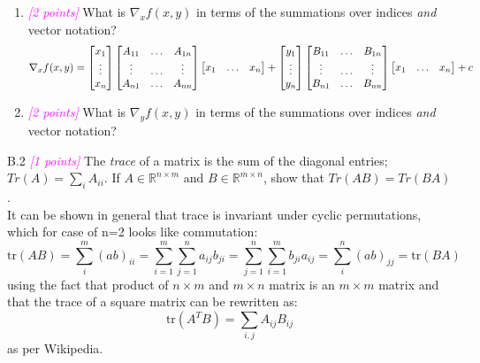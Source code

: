 \documentclass{article}
\newcommand{\1}{\mathbf{1}}
\newcommand{\points}[1]{\small\textcolor{magenta}{\emph{[#1 points]}} \normalsize}
\begin{document}
\begin{enumerate}
	\item \points{2} What is $\nabla_x f(x,y)$ in terms of the summations over indices \emph{and} vector notation?
	$$
	\nabla_x f(x, y) = 
	\begin{bmatrix} x_1  \\ \vdots \\ x_n \end{bmatrix} \begin{bmatrix} A_{11} & \hdots & A_{1n} \\ \vdots & \hdots & \vdots \\ A_{n1} & \hdots & A_{nn}\end{bmatrix} \begin{bmatrix} x_1  & \hdots & x_n \end{bmatrix} 
	+
	\begin{bmatrix} y_1  \\ \vdots \\ y_n \end{bmatrix} \begin{bmatrix} B_{11} & \hdots & B_{1n} \\ \vdots & \hdots & \vdots \\ B_{n1} & \hdots & B_{nn}\end{bmatrix} \begin{bmatrix} x_1  & \hdots & x_n \end{bmatrix} 
	+
	c \\
	$$
	\item \points{2} What is $\nabla_y f(x,y)$ in terms of the summations over indices \emph{and} vector notation?
\end{enumerate}

B.2 \points{1} The \textit{trace} of a matrix is the sum of the diagonal entries; $Tr(A) = \sum_i A_{ii}$. If $A\in\mathbb{R}^{n\times m}$ and $B\in\mathbb{R}^{m\times n}$, show that $Tr(AB) = Tr(BA)$.\\
It can be shown in general that trace is invariant under cyclic permutations, which for case of n=2 looks like commutation:
$$\text{tr}(AB)=\sum_i^m (ab)_{ii} = \sum_{i=1}^m\sum_{j=1}^n a_{ij}b_{ji}= \sum_{j=1}^n\sum_{i=1}^m b_{ji}a_{ij} = \sum_i^n (ab)_{jj} = \text{tr}(BA)$$
using the fact that product of $n\times m$ and $m\times n$ matrix is an $m\times m$ matrix and that the trace of a square matrix can be rewritten as:
$$\text{tr}(A^TB)=\sum_{i,j}A_{ij}B_{ij}$$
as per Wikipedia.\\
\end{document}

